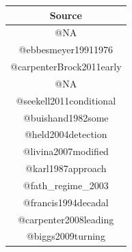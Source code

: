 \documentclass[12pt,twoside,openany]{reedthesis}
\begin{document}
\begin{longtable}[]{@{}c@{}}
\toprule
\begin{minipage}[b]{0.46\columnwidth}\centering
Source\strut
\end{minipage}\tabularnewline
\midrule
\endhead
\begin{minipage}[t]{0.46\columnwidth}\centering
@NA\strut
\end{minipage}\tabularnewline
\begin{minipage}[t]{0.46\columnwidth}\centering
@ebbesmeyer19911976\strut
\end{minipage}\tabularnewline
\begin{minipage}[t]{0.46\columnwidth}\centering
@carpenterBrock2011early\strut
\end{minipage}\tabularnewline
\begin{minipage}[t]{0.46\columnwidth}\centering
@NA\strut
\end{minipage}\tabularnewline
\begin{minipage}[t]{0.46\columnwidth}\centering
@seekell2011conditional\strut
\end{minipage}\tabularnewline
\begin{minipage}[t]{0.46\columnwidth}\centering
@buishand1982some\strut
\end{minipage}\tabularnewline
\begin{minipage}[t]{0.46\columnwidth}\centering
@held2004detection\strut
\end{minipage}\tabularnewline
\begin{minipage}[t]{0.46\columnwidth}\centering
@livina2007modified\strut
\end{minipage}\tabularnewline
\begin{minipage}[t]{0.46\columnwidth}\centering
@karl1987approach\strut
\end{minipage}\tabularnewline
\begin{minipage}[t]{0.46\columnwidth}\centering
@fath\_regime\_2003\strut
\end{minipage}\tabularnewline
\begin{minipage}[t]{0.46\columnwidth}\centering
@francis1994decadal\strut
\end{minipage}\tabularnewline
\begin{minipage}[t]{0.46\columnwidth}\centering
@carpenter2008leading\strut
\end{minipage}\tabularnewline
\begin{minipage}[t]{0.46\columnwidth}\centering
@biggs2009turning\strut
\end{minipage}\tabularnewline

\end{longtable}
\end{document}
